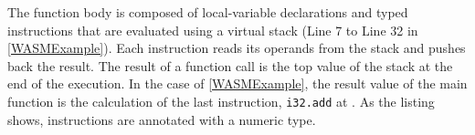 \begin{code}
    \begin{minipage}[b]{0.45\linewidth}

\end{minipage}\hspace{10mm}
\begin{minipage}[b]{0.46\linewidth}
%

\end{minipage}






\end{code}


The function body is composed of local-variable declarations and typed instructions that are evaluated using a virtual stack (Line 7 to Line 32 in \autoref{WASMExample}). Each instruction reads its operands from the stack and pushes back the result. The result of a function call is the top value of the stack at the end of the execution. In the case of \autoref{WASMExample}, the result value of the main function is the calculation of the last instruction, \texttt{i32.add} at . 
As the listing shows, instructions are annotated with a numeric type.


\label{background:wasm:ecosystems}


